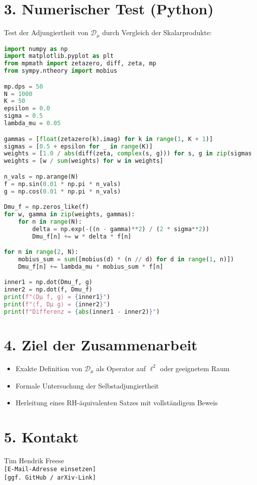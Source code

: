 \documentclass[12pt]{article}
\begin{document}
\section*{3. Numerischer Test (Python)}

\noindent Test der Adjungiertheit von \(\mathcal{D}_\mu\) durch Vergleich der Skalarprodukte:

\begin{lstlisting}[language=Python, basicstyle=\ttfamily\footnotesize, breaklines=true, backgroundcolor=\color{gray!10}]
import numpy as np
import matplotlib.pyplot as plt
from mpmath import zetazero, diff, zeta, mp
from sympy.ntheory import mobius

mp.dps = 50
N = 1000
K = 50
epsilon = 0.0
sigma = 0.5
lambda_mu = 0.05

gammas = [float(zetazero(k).imag) for k in range(1, K + 1)]
sigmas = [0.5 + epsilon for _ in range(K)]
weights = [1.0 / abs(diff(zeta, complex(s, g))) for s, g in zip(sigmas, gammas)]
weights = [w / sum(weights) for w in weights]

n_vals = np.arange(N)
f = np.sin(0.01 * np.pi * n_vals)
g = np.cos(0.01 * np.pi * n_vals)

Dmu_f = np.zeros_like(f)
for w, gamma in zip(weights, gammas):
    for n in range(N):
        delta = np.exp(-((n - gamma)**2) / (2 * sigma**2))
        Dmu_f[n] += w * delta * f[n]

for n in range(2, N):
    mobius_sum = sum([mobius(d) * (n // d) for d in range(1, n)])
    Dmu_f[n] += lambda_mu * mobius_sum * f[n]

inner1 = np.dot(Dmu_f, g)
inner2 = np.dot(f, Dmu_f)
print(f"⟨Dµ f, g⟩ = {inner1}")
print(f"⟨f, Dµ g⟩ = {inner2}")
print(f"Differenz = {abs(inner1 - inner2)}")
\end{lstlisting}

\vspace{1em}

\section*{4. Ziel der Zusammenarbeit}

\begin{itemize}
  \item Exakte Definition von \(\mathcal{D}_\mu\) als Operator auf \(\ell^2\) oder geeignetem Raum
  \item Formale Untersuchung der Selbstadjungiertheit
  \item Herleitung eines RH-äquivalenten Satzes mit vollständigem Beweis
\end{itemize}

\section*{5. Kontakt}
Tim Hendrik Freese\\
\texttt{[E-Mail-Adresse einsetzen]}\\
\texttt{[ggf. GitHub / arXiv-Link]}
\end{document}
